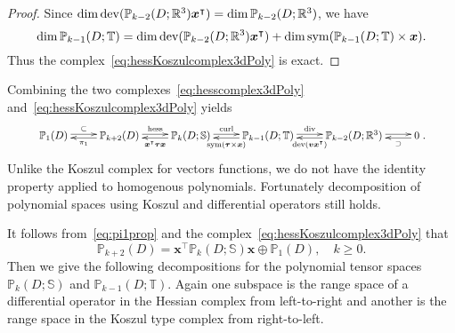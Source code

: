 \begin{proof}
Since $\dim\operatorname{dev}(\mathbb P_{k-2}(D;\mathbb R^3)\boldsymbol x^{\intercal})=\dim\mathbb P_{k-2}(D;\mathbb R^3)$,
we have
\[
\dim\mathbb P_{k-1}(D;\mathbb T)=\dim\operatorname{dev}(\mathbb P_{k-2}(D;\mathbb R^3)\boldsymbol x^{\intercal})+\dim\operatorname{sym}(\mathbb P_{k-1}(D;\mathbb T)\times\boldsymbol x).
\]
Thus the complex~\eqref{eq:hessKoszulcomplex3dPoly} is exact.
\end{proof}

Combining the two complexes~\eqref{eq:hesscomplex3dPoly} and~\eqref{eq:hessKoszulcomplex3dPoly} yields
\begin{equation}\label{eq:hesscomplex3dPolydouble}
\resizebox{.91\hsize}{!}{$
\xymatrix{
\mathbb P_1(D)\ar@<0.4ex>[r]^-{\subset} & \mathbb P_{k+2}(D)\ar@<0.4ex>[r]^-{\hess}\ar@<0.4ex>[l]^-{\pi_{1}} & \mathbb P_{k}(D;\mathbb S)\ar@<0.4ex>[r]^-{\curl}\ar@<0.4ex>[l]^-{\boldsymbol x^{\intercal}\boldsymbol\tau\boldsymbol x}  & \mathbb P_{k-1}(D;\mathbb T) \ar@<0.4ex>[r]^-{\div}\ar@<0.4ex>[l]^-{\sym(\boldsymbol\tau\times\boldsymbol x)} & \mathbb P_{k-2}(D;\mathbb R^3)  \ar@<0.4ex>[r]^-{} \ar@<0.4ex>[l]^-{\dev(\boldsymbol v\boldsymbol x^{\intercal})}
& 0 \ar@<0.4ex>[l]^-{\supset} }.
$}
\end{equation}
Unlike the Koszul complex for vectors functions, we do not have the identity property applied to homogenous polynomials. Fortunately decomposition of polynomial spaces using Koszul and differential operators still holds.

It follows from~\eqref{eq:pi1prop} and the complex~\eqref{eq:hessKoszulcomplex3dPoly} that
\begin{equation}\label{eq:hesspolyspacedecomp1}
\mathbb P_{k+2}(D)=\boldsymbol x^{\intercal}\mathbb P_{k}(D;\mathbb S)\boldsymbol x\oplus\mathbb P_1(D), \quad k\geq 0.
\end{equation}
Then we give the following decompositions for the polynomial tensor spaces $\mathbb P_{k}(D;\mathbb S)$ and $\mathbb P_{k-1}(D;\mathbb T)$. Again one subspace is the range space of a differential operator in the Hessian complex from left-to-right and another is the range space in the Koszul type complex from right-to-left.

